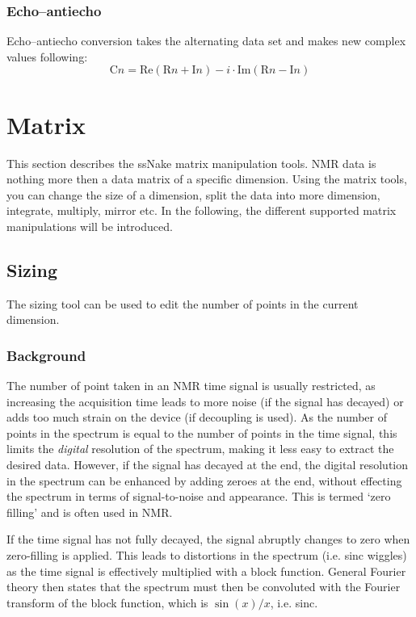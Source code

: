 \documentclass[11pt,a4paper]{article}
\begin{document}
\subsubsection{Echo--antiecho}
Echo--antiecho conversion takes the alternating data set and makes new complex values following:
\begin{equation*}
  \text{C}n = \text{Re}(\text{R}n + \text{I}n ) - i \cdot \text{Im}(\text{R}n - \text{I}n )
\end{equation*}



\section{Matrix}
This section describes the ssNake matrix manipulation tools. NMR data is nothing more then a data matrix of a specific dimension. Using the matrix tools, you can change the size of a dimension, split the data into more dimension, integrate, multiply, mirror etc. In the following, the different supported matrix manipulations will be introduced.


\subsection{Sizing}
The sizing tool can be used to edit the number of points in the current dimension. 

\subsubsection*{Background}
The number of point taken in an NMR time signal is usually restricted, as increasing the acquisition time leads to more noise (if the signal has decayed) or adds too much strain on the device (if decoupling is used). As the number of points in the spectrum is equal to the number of points in the time signal, this limits the \textit{digital} resolution of the spectrum, making it less easy to extract the desired data. However, if the signal has decayed at the end, the digital resolution in the spectrum can be enhanced by adding zeroes at the end, without effecting the spectrum in terms of signal-to-noise and appearance. This is termed `zero filling' and is often used in NMR.

If the time signal has not fully decayed, the signal abruptly changes to zero when zero-filling is applied. This leads to distortions in the spectrum (i.e. sinc wiggles) as the time signal is effectively multiplied with a block function. General Fourier theory then states that the spectrum must then be convoluted with the Fourier transform of the block function, which is $\sin(x)/x$, i.e. sinc.
\end{document}
